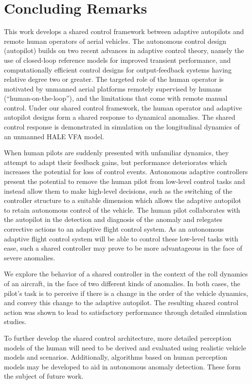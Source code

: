 \chapter{Concluding Remarks} \label{sec:conclusion}
This work develops a shared control framework between adaptive autopilots and remote human operators of aerial vehicles. The autonomous control design (autopilot) builds on two recent advances in adaptive control theory, namely the use of closed-loop reference models for improved transient performance, and computationally efficient control designs for output-feedback systems having relative degree two or greater. The targeted role of the human operator is motivated by unmanned aerial platforms remotely supervised by humans (``human-on-the-loop''), and the limitations that come with remote manual control. Under our shared control framework, the human operator and adaptive autopilot designs form a shared response to dynamical anomalies. The shared control response is demonstrated in simulation on the longitudinal dynamics of an unmanned HALE VFA model. 


When human pilots are suddenly presented with unfamiliar dynamics, they attempt to adapt their feedback gains, but performance deteriorates which increases the potential for loss of control events. Autonomous adaptive controllers present the potential to remove the human pilot from low-level control tasks and instead allow them to make high-level decisions, such as the switching of the controller structure to a suitable dimension which allows the adaptive autopilot to retain autonomous control of the vehicle. The human pilot collaborates with the autopilot in the detection and diagnosis of the anomaly and relegates corrective actions to an adaptive flight control system. As an autonomous adaptive flight control system will be able to control these low-level tasks with ease, such a shared controller may prove to be more advantageous in the face of severe anomalies.

We explore the behavior of a shared controller in the context of the roll dynamics of an aircraft, in the face of two different kinds of anomalies. In both cases, the pilot's task is to perceive if there is a change in the order of the vehicle dynamics, and convey this change to the adaptive autopilot. The resulting shared control action was shown to lead to satisfactory performance through detailed simulation studies.

To further develop the shared control architecture, more detailed perception models of the human will need to be derived and evaluated using realistic vehicle models and scenarios. Additionally, algorithms based on human perception models may be developed to aid in autonomous anomaly detection. These form the subject of future work.